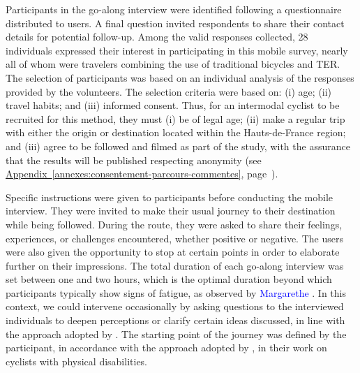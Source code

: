 \begin{refsegment}
Participants in the go-along interview were identified following a questionnaire distributed to users. A final question invited respondents to share their contact details for potential follow-up. Among the valid responses collected, 28 individuals expressed their interest in participating in this mobile survey, nearly all of whom were travelers combining the use of traditional bicycles and \acrshort{TER}. The selection of participants was based on an individual analysis of the responses provided by the volunteers. The selection criteria were based on: (i) age; (ii) travel habits; and (iii) informed consent. Thus, for an intermodal cyclist to be recruited for this method, they must (i) be of legal age; (ii) make a regular trip with either the origin or destination located within the Hauts-de-France region; and (iii) agree to be followed and filmed as part of the study, with the assurance that the results will be published respecting anonymity (see \hyperref[annexes:consentement-parcours-commentes]{Appendix~\ref{annexes:consentement-parcours-commentes}}, page~\pageref{annexes:consentement-parcours-commentes}).%

Specific instructions were given to participants before conducting the mobile interview. They were invited to make their usual journey to their destination while being followed. During the route, they were asked to share their feelings, experiences, or challenges encountered, whether positive or negative. The users were also given the opportunity to stop at certain points in order to elaborate further on their impressions. The total duration of each go-along interview was set between one and two hours, which is the optimal duration beyond which participants typically show signs of fatigue, as observed by \textcolor{blue}{Margarethe} \textcolor{blue}{\textcite[456, 464]{kusenbach_street_2003}}. In this context, we could intervene occasionally by asking questions to the interviewed individuals to deepen perceptions or clarify certain ideas discussed, in line with the approach adopted by \textcolor{blue}{\textcite[112]{bergeron_uncovering_2014}}. The starting point of the journey was defined by the participant, in accordance with the approach adopted by \textcolor{blue}{\textcite[3]{cox_qualitative_2020}}, in their work on cyclists with physical disabilities.%


\end{refsegment}
